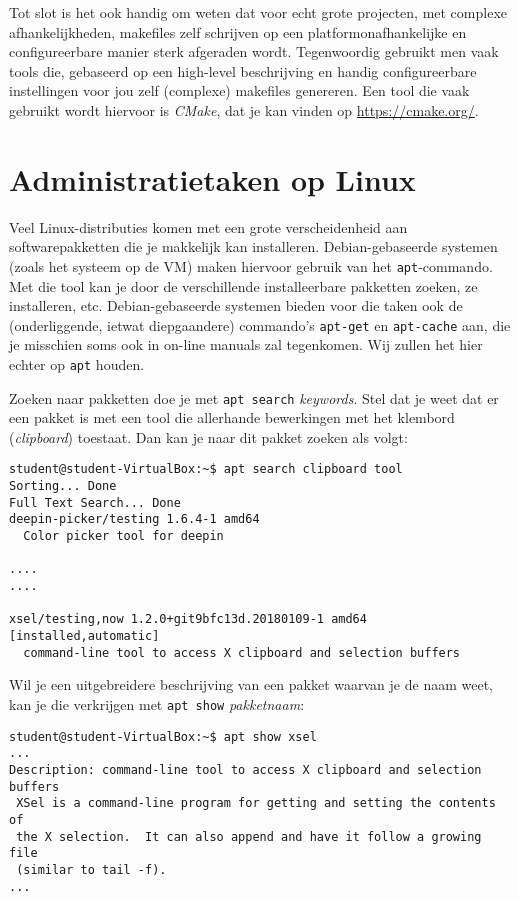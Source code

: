 \documentclass[a4paper,twoside,openany]{memoir}
\begin{document}
Tot slot is het ook handig om weten dat voor echt grote projecten, met complexe
afhankelijkheden, makefiles zelf schrijven op een platformonafhankelijke en
configureerbare manier sterk afgeraden wordt. Tegenwoordig gebruikt men vaak
tools die, gebaseerd op een high-level beschrijving en handig configureerbare
instellingen voor jou zelf (complexe) makefiles genereren. Een tool die vaak
gebruikt wordt hiervoor is \emph{CMake}, dat je kan vinden op
\url{https://cmake.org/}.

\chapter{Administratietaken op Linux}

Veel Linux-distributies komen met een grote verscheidenheid aan
softwarepakketten die je makkelijk kan installeren. Debian-gebaseerde systemen
(zoals het systeem op de VM) maken hiervoor gebruik van het \verb!apt!-commando.
Met die tool kan je door de verschillende installeerbare pakketten zoeken, ze
installeren, etc. Debian-gebaseerde systemen bieden voor die taken ook de
(onderliggende, ietwat diepgaandere) commando's \verb!apt-get! en
\verb!apt-cache! aan, die je misschien soms ook in on-line manuals zal
tegenkomen. Wij zullen het hier echter op \verb!apt! houden.

Zoeken naar pakketten doe je met \verb!apt search! \emph{keywords}. Stel dat je
weet dat er een pakket is met een tool die allerhande bewerkingen met het
klembord (\emph{clipboard}) toestaat. Dan kan je naar dit pakket zoeken als
volgt:
\begin{verbatim}
student@student-VirtualBox:~$ apt search clipboard tool
Sorting... Done
Full Text Search... Done
deepin-picker/testing 1.6.4-1 amd64
  Color picker tool for deepin

....
....

xsel/testing,now 1.2.0+git9bfc13d.20180109-1 amd64 [installed,automatic]
  command-line tool to access X clipboard and selection buffers
\end{verbatim}

Wil je een uitgebreidere beschrijving van een pakket waarvan je de naam weet,
kan je die verkrijgen met \verb!apt show! \emph{pakketnaam}:

\begin{verbatim}
student@student-VirtualBox:~$ apt show xsel
...
Description: command-line tool to access X clipboard and selection buffers
 XSel is a command-line program for getting and setting the contents of
 the X selection.  It can also append and have it follow a growing file
 (similar to tail -f).
...
\end{verbatim}
\end{document}
